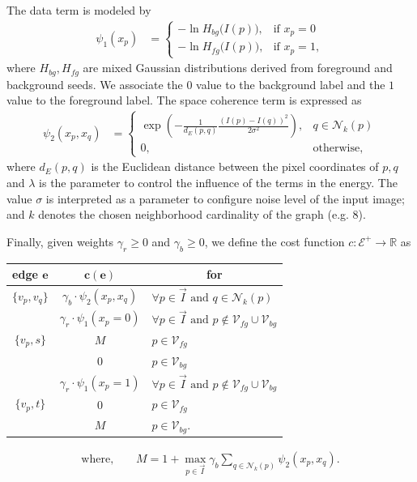 The data term is modeled by
\begin{align*}
	\psi_1(x_p) &= \left\{ \begin{array}{ll}
	-\ln  H_{bg}\big( I(p) \big), & \text{if } x_p=0  \\[1em]	
	-\ln  H_{fg}\big( I(p) \big), & \text{if } x_p=1,
	\end{array}\right.
\end{align*}
where $H_{bg},H_{fg}$ are mixed Gaussian distributions derived from foreground and background seeds. We associate the $0$ value to the background label and the $1$ value to the foreground label. The space coherence term is expressed as
\begin{align*}
	\psi_{2}(x_p,x_q) &= \left\{ \begin{array}{ll}
	\displaystyle \exp{ \left(- \frac{1}{d_E(p,q)}\frac{(I(p) - I(q))^2}{2\sigma^2} \right) }, & q \in \mathcal{N}_k(p) \\[1em]
	0, & \text{otherwise},
	\end{array}\right.
\end{align*}
%
where $d_E(p,q)$ is the Euclidean distance between the pixel coordinates of $p,q$ and $\lambda$ is the parameter to control the influence of the terms in the energy. The value $\sigma$ is interpreted as a parameter to configure noise level of the input image; and $k$ denotes the chosen neighborhood cardinality of the graph (e.g. $8$).

Finally, given weights $\gamma_r \geq 0$ and $\gamma_b \geq 0$, we define the cost function $c:\mathcal{E}^+\rightarrow \mathbb{R}$ as

\begin{table}[h]
\center
\setlength{\extrarowheight}{0.75em}
\begin{tabular}{|c|c|l|}	
\hline
	\multicolumn{1}{|c|}{\textbf{edge} $\mathbf{e}$} & \multicolumn{1}{c|}{$\mathbf{c(e)}$} & \multicolumn{1}{c|}{\textbf{for}}\\
	\hline
	$\{v_p,v_q\}$ & $\gamma_b \cdot \psi_{2}(x_p,x_q)$ & $\forall p \in \vec{I} \text{ and } q \in \mathcal{N}_k(p)$\\
	\hline
	\multirow{3}{*}{ $\{v_p,s\}$ } & $\gamma_r \cdot \psi_1(x_p=0)$ & $\forall p \in \vec{I} \text{ and } p \notin \mathcal{V}_{fg} \cup \mathcal{V}_{bg}$\\
	& $M$ & $p \in \mathcal{V}_{fg}$ \\
	& $0$ & $p \in \mathcal{V}_{bg}$\\
	\hline
	\multirow{3}{*}{ $\{v_p,t\}$ } & $\gamma_r \cdot \psi_1(x_p=1)$ & $\forall p \in \vec{I} \text{ and } p \notin \mathcal{V}_{fg} \cup \mathcal{V}_{bg}$\\
	& $0$ & $p \in \mathcal{V}_{fg}$ \\
	& $M$ & $p \in \mathcal{V}_{bg}$. \\
	\hline
\end{tabular}
\begin{align*}
\text{where,} \qquad M = 1 + \max_{p \in \vec{I}}{\gamma_b \sum_{q \in \mathcal{N}_k(p)}}{\psi_2(x_p,x_q)}.
\end{align*}
\end{table}

